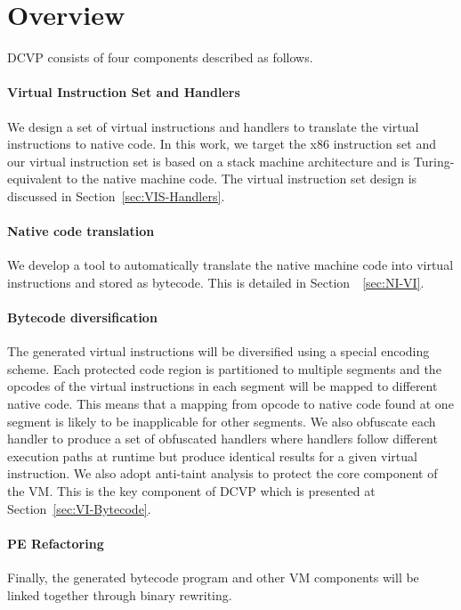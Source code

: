 \section{Overview}\label{sec:overview}
DCVP consists of four components described as follows.

\paragraph{Virtual Instruction Set and Handlers} We design a set of virtual instructions and handlers to translate the virtual instructions to native code. In this work, we target the x86 instruction set and our virtual instruction set is based on a stack machine architecture and is Turing-equivalent to the native machine code.  The virtual instruction set design is discussed in Section~\ref{sec:VIS-Handlers}.

\paragraph{Native code translation}
We develop a tool to automatically translate the native machine code into virtual instructions and stored as bytecode. This is detailed in Section~~\ref{sec:NI-VI}.
\paragraph{Bytecode diversification}  The generated virtual instructions will be diversified using a special encoding scheme. Each protected code region is partitioned to multiple segments and the opcodes of the virtual instructions in each segment will be  mapped to different native code. This means that a mapping from opcode to native code found at one segment is likely to be inapplicable for other segments.  We also obfuscate each handler to produce a set of obfuscated handlers where handlers follow different execution paths at runtime but produce identical results for a given virtual instruction. We also adopt anti-taint analysis to protect the core component of the VM. This is the key component of DCVP which is presented at Section~\ref{sec:VI-Bytecode}.

\paragraph{PE Refactoring}
Finally, the generated bytecode program and other VM components will be linked together through binary rewriting.




